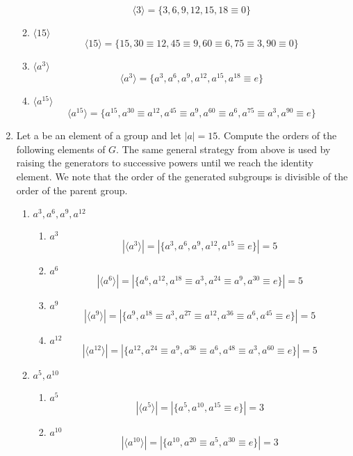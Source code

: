 \documentclass{article}
\begin{document}
\begin{enumerate}
\begin{enumerate}
        $$\langle3\rangle = \{3, 6, 9, 12, 15, 18\equiv0\}$$
        \item $\langle15\rangle$
        $$\langle15\rangle = \{15, 30\equiv12, 45\equiv9, 60\equiv6, 75\equiv3, 90\equiv0\}$$
        \item $\langle a^3\rangle$
        $$\langle a^3\rangle = \{a^3, a^6, a^9, a^{12}, a^{15}, a^{18}\equiv e\}$$
        \item $\langle a^{15}\rangle$
        $$\langle a^{15}\rangle = \{a^{15}, a^{30}\equiv a^{12}, a^{45}\equiv a^9, a^{60}\equiv a^6, a^{75}\equiv a^3, a^{90}\equiv e\}$$
    \end{enumerate}
    \item Let a be an element of a group and let $|a| = 15$. Compute the orders of the following elements of $G$.
    \newline\newline
    The same general strategy from above is used by raising the generators to successive powers until we reach the identity element. We note that the order of the generated subgroups is divisible of the order of the parent group.
    \begin{enumerate}
        \item $a^3, a^6, a^9, a^{12}$
        \begin{enumerate}
            \item $a^3$
        $$|\langle a^3\rangle| = |\{a^3, a^6, a^9, a^{12}, a^{15}\equiv e\}| = 5$$
            \item $a^6$
        $$|\langle a^6\rangle| = |\{a^6, a^{12}, a^{18}\equiv a^3, a^{24}\equiv a^9, a^{30}\equiv e\}| = 5$$
            \item $a^9$
        $$|\langle a^9\rangle| = |\{a^9, a^{18}\equiv a^3, a^{27}\equiv a^{12}, a^{36}\equiv a^6, a^{45}\equiv e\}| = 5$$
            \item $a^{12}$
        $$|\langle a^{12}\rangle| = |\{a^{12}, a^{24}\equiv a^9, a^{36}\equiv a^6, a^{48}\equiv a^3, a^{60}\equiv e\}| = 5$$
        \end{enumerate}
        \item $a^5, a^{10}$
        \begin{enumerate}
            \item $a^5$
        $$|\langle a^5\rangle| = |\{a^5, a^{10}, a^{15}\equiv e\}| = 3$$
            \item $a^{10}$
        $$|\langle a^{10}\rangle| = |\{a^{10}, a^{20}\equiv a^5, a^{30}\equiv e\}| = 3$$
        \end{enumerate}

\end{enumerate}
\end{enumerate}
\end{document}

